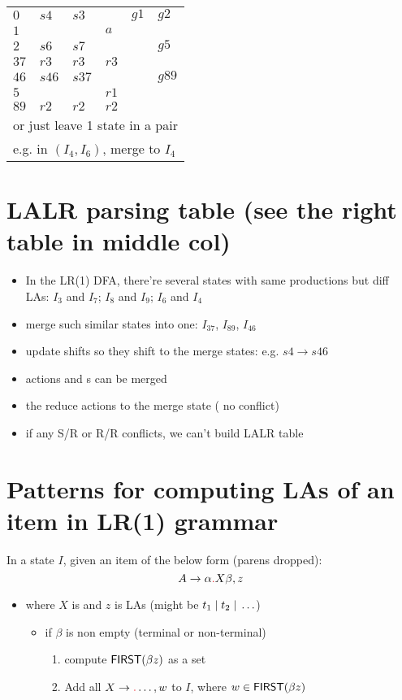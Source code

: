 \documentclass[10pt,a4paper,landscape]{article}
\begin{document}
\begin{multicols*}{3}
\begin{minipage}{.5\linewidth}
\begin{tabular}{l|lll|ll}
    \hline
    $0$ & $s4$ & $s3$ &     & $g1$ & $g2$ \\
    $1$ &      &      & $a$ &      &      \\
    $2$ & $s6$ & $s7$ &  &      & $g5$ \\
    $37$ & $r3$ & $r3$ & $r3$  &   &  \\
    $46$ & $s46$  & $s37$  &   &   & $g89$ \\
    $5$ &   &   & $r1$  &   &  \\
    $89$ & $r2$  & $r2$  & $r2$ &   &  \\
    \hline
    \multicolumn{6}{l}{or just leave 1 state in a pair}\\
    \multicolumn{6}{l}{e.g. in $(I_4, I_6)$, merge to $I_4$}  \\
    \hline
  \end{tabular}
\end{minipage}
\section*{LALR parsing table (see the right table in middle col)}
\begin{itemize}
\item In the LR(1) DFA, there're several states with same productions but diff LAs: $I_3$ and $I_7$; $I_8$ and $I_9$; $I_6$ and $I_4$
\item merge such similar states into one: $I_{37}$, $I_{89}$, $I_{46}$
\item update shifts so they shift to the merge states: e.g. $s4\to s46$
\item {}  actions and s can be merged
\item {} the reduce actions to the merge state ( no conflict)
\item if any S/R or R/R conflicts, we can't build LALR table
\end{itemize}
\section*{Patterns for computing LAs of an item in LR(1) grammar}
In a state $I$, given an item of the below form (parens dropped):
  \[
    A\to \alpha\lrd X\beta, z
  \]
\begin{itemize}
\item where $X$ is  and $z$ is LAs (might be $t_1\;|\; t_2\;|\;\ldots$)
  \begin{itemize}[leftmargin=3em]
  \item if $\beta$ is non empty (terminal or non-terminal)
    \begin{enumerate}
    \item compute $\mfn{first}(\beta z)$ as a set
    \item Add all $X\to\lrd \ldots, w$ to $I$, where $w \in \mfn{first}(\beta z)$


\end{enumerate}
\end{itemize}
\end{itemize}
\end{multicols*}
\end{document}
